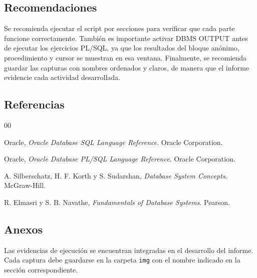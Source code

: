 \documentclass{article}
\begin{document}
\subsection{Recomendaciones}

Se recomienda ejecutar el script por secciones para verificar que cada parte funcione correctamente. También es importante activar DBMS OUTPUT antes de ejecutar los ejercicios PL/SQL, ya que los resultados del bloque anónimo, procedimiento y cursor se muestran en esa ventana. Finalmente, se recomienda guardar las capturas con nombres ordenados y claros, de manera que el informe evidencie cada actividad desarrollada.

\subsection{Referencias}

\begin{thebibliography}{00}

Oracle, \textit{Oracle Database SQL Language Reference}. Oracle Corporation.

Oracle, \textit{Oracle Database PL/SQL Language Reference}. Oracle Corporation.

A. Silberschatz, H. F. Korth y S. Sudarshan, \textit{Database System Concepts}. McGraw-Hill.

R. Elmasri y S. B. Navathe, \textit{Fundamentals of Database Systems}. Pearson.

\end{thebibliography}

\subsection{Anexos}

Las evidencias de ejecución se encuentran integradas en el desarrollo del informe. Cada captura debe guardarse en la carpeta \texttt{img} con el nombre indicado en la sección correspondiente.

\vfill
\end{document}
